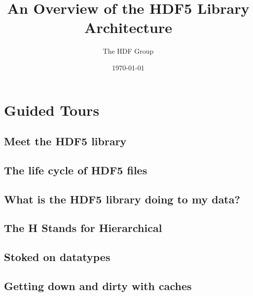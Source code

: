 \documentclass[letterpaper,hyper]{HDF}
\title{An Overview of the HDF5 Library Architecture}
\author{The HDF Group}
\date{\today}
\begin{document}
\maketitle



\makerevisions

\tableofcontents
\listoffigures
\listoflistings
{}

\newpage
\glsdisablehyper
\printglossary[type=\acronymtype]
\printglossary



\chapter{Guided Tours}\label{part:tours}


\section{Meet the HDF5 library}\label{chap:hdf5-lib}


\section{The life cycle of HDF5 files}\label{sec:tour2}


\section{What is the HDF5 library doing to my data?}\label{sec:tour3}


\section{The H Stands for Hierarchical}\label{chap:groups-and-links}


\section{Stoked on datatypes}\label{sec:tour5}


\section{Getting down and dirty with caches}\label{sec:tour6}

\end{document}
